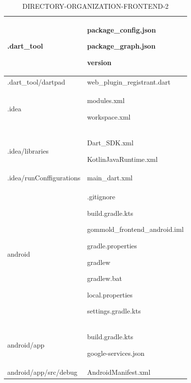 \documentclass[conference]{IEEEtran}
\begin{document}
          
\begin{table}[h]
\caption{DIRECTORY-ORGANIZATION-FRONTEND-2}
\def\arraystretch{1.24} \small
    \begin{tabular}{|p{3.7cm}|p{4.1cm}|}
\hline
          
          .dart\_tool \par   & \par package\_config.json \par package\_graph.json \par version 
          \\ \hline
          
          .dart\_tool/dartpad \par  &\par web\_plugin\_registrant.dart
          \\ \hline
          
          .idea \par   & modules.xml \par workspace.xml
          \\ \hline
          
          .idea/libraries \par & Dart\_SDK.xml \par KotlinJavaRuntime.xml
          \\ \hline
          
          .idea/runConffigurations \par  & main\_dart.xml  
          \\ \hline

          android \par & .gitignore \par build.gradle.kts \par gommold\_frontend\_android.iml \par gradle.properties \par gradlew \par gradlew.bat \par local.properties \par settings.gradle.kts
          \\ \hline
          
          android/app \par   & \par build.gradle.kts \par google-services.json \par 
          \\ \hline

          android/app/src/debug \par   & \par AndroidManifest.xml
          \\ \hline


\end{tabular}
\end{table}
\end{document}
